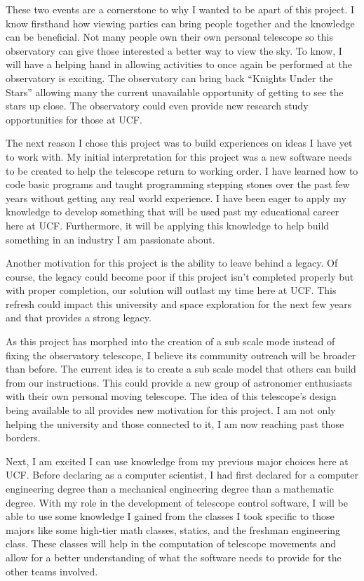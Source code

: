 \documentclass[12pt]{article}
\begin{document}
These two events are a cornerstone to why I wanted to be apart of this project. I know firsthand how viewing parties can bring people together and the knowledge can be beneficial. Not many people own their own personal telescope so this observatory can give those interested a better way to view the sky. To know, I will have a helping hand in allowing activities to once again be performed at the observatory is exciting. The observatory can bring back “Knights Under the Stars” allowing many the current unavailable opportunity of getting to see the stars up close. The observatory could even provide new research study opportunities for those at UCF.

The next reason I chose this project was to build experiences on ideas I have yet to work with. My initial interpretation for this project was a new software needs to be created to help the telescope return to working order. I have learned how to code basic programs and taught programming stepping stones over the past few years without getting any real world experience. I have been eager to apply my knowledge to develop something that will be used past my educational career here at UCF. Furthermore, it will be applying this knowledge to help build something in an industry I am passionate about.

Another motivation for this project is the ability to leave behind a legacy. Of course, the legacy could become poor if this project isn’t completed properly but with proper completion, our solution will outlast my time here at UCF. This refresh could impact this university and space exploration for the next few years and that provides a strong legacy.

As this project has morphed into the creation of a sub scale mode instead of fixing the observatory telescope, I believe its community outreach will be broader than before. The current idea is to create a sub scale model that others can build from our instructions. This could provide a new group of astronomer enthusiasts with their own personal moving telescope. The idea of this telescope’s design being available to all provides new motivation for this project. I am not only helping the university and those connected to it, I am now reaching past those borders.

Next, I am excited I can use knowledge from my previous major choices here at UCF. Before declaring as a computer scientist, I had first declared for a computer engineering degree than a mechanical engineering degree than a mathematic degree. With my role in the development of telescope control software, I will be able to use some knowledge I gained from the classes I took specific to those majors like some high-tier math classes, statics, and the freshman engineering class. These classes will help in the computation of telescope movements and allow for a better understanding of what the software needs to provide for the other teams involved.
\end{document}
